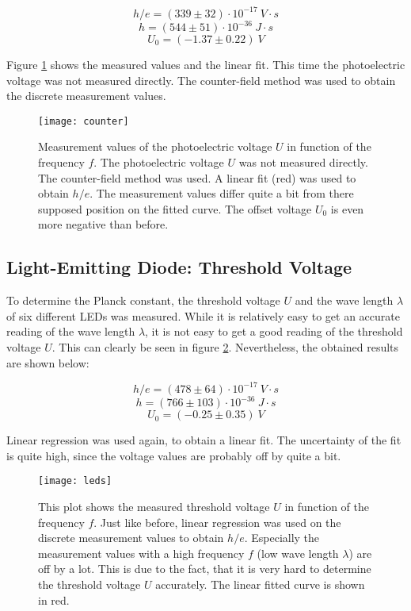 \[
h/e = (339\pm 32)\cdot 10^{-17}\ \si{V}\cdot\si{s}
\]
\[
h = (544\pm 51)\cdot 10^{-36}\ \si{J}\cdot\si{s}
\]
\[
U_0 = (-1.37\pm 0.22)\ \si{V}
\]

Figure \ref{fig:counter} shows the measured values and the linear fit. This time the photoelectric voltage was not measured directly. The counter-field method was used to obtain the discrete measurement values.

\begin{figure}[H]
	\centering
	\texttt{[image: counter]}
	\caption{Measurement values of the photoelectric voltage $U$ in function of the frequency $f$. The photoelectric voltage $U$ was not measured directly. The counter-field method was used. A linear fit (red) was used to obtain $h/e$. The measurement values differ quite a bit from there supposed position on the fitted curve. The offset voltage $U_0$ is even more negative than before.}
	\label{fig:counter}
\end{figure}

\newpage
\subsection{Light-Emitting Diode: Threshold Voltage}
\label{subsec:LED_Threshold_Voltage}
To determine the Planck constant, the threshold voltage $U$ and the wave length $\lambda$ of six different LEDs was measured. While it is relatively easy to get an accurate reading of the wave length $\lambda$, it is not easy to get a good reading of the threshold voltage $U$. This can clearly be seen in figure \ref{fig:leds}. Nevertheless, the obtained results are shown below:

\[
h/e = (478\pm 64)\cdot 10^{-17}\ \si{V}\cdot\si{s}
\]
\[
h = (766\pm 103)\cdot 10^{-36}\ \si{J}\cdot\si{s}
\]
\[
U_0 = (-0.25\pm 0.35)\ \si{V}
\]

Linear regression was used again, to obtain a linear fit. The uncertainty of the fit is quite high, since the voltage values are probably off by quite a bit.

\begin{figure}[H]
	\centering
	\texttt{[image: leds]}
	\caption{This plot shows the measured threshold voltage $U$ in function of the frequency $f$. Just like before, linear regression was used on the discrete measurement values to obtain $h/e$. Especially the measurement values with a high frequency $f$ (low wave length $\lambda$) are off by a lot. This is due to the fact, that it is very hard to determine the threshold voltage $U$ accurately. The linear fitted curve is shown in red.}
	\label{fig:leds}
\end{figure}

